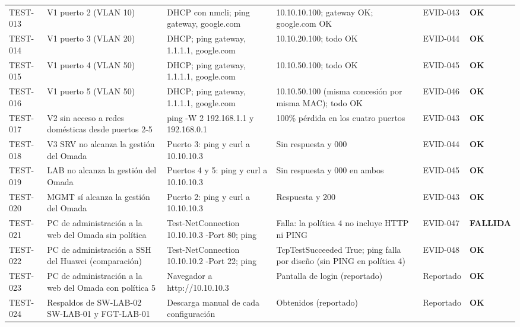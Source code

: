 \documentclass[11pt,a4paper]{article}
\newcommand{\estado}[1]{%
  \ifstrequal{#1}{COMPLETADA}{\textcolor{okgreen}{\textbf{\footnotesize #1}}}{%
  \ifstrequal{#1}{OPERATIVO VALIDADO}{\textcolor{okgreen}{\textbf{\footnotesize #1}}}{%
  \ifstrequal{#1}{OK}{\textcolor{okgreen}{\textbf{\footnotesize #1}}}{%
  \ifstrequal{#1}{RESUELTO}{\textcolor{okgreen}{\textbf{\footnotesize #1}}}{%
  \ifstrequal{#1}{EN CURSO}{\textcolor{amber}{\textbf{\footnotesize #1}}}{%
  \ifstrequal{#1}{REPORTADO}{\textcolor{amber}{\textbf{\footnotesize #1}}}{%
  \ifstrequal{#1}{NO EJECUTADA}{\textcolor{muted}{\textbf{\footnotesize #1}}}{%
  \ifstrequal{#1}{PROPUESTO}{\textcolor{violet}{\textbf{\footnotesize #1}}}{%
  \ifstrequal{#1}{PENDIENTE}{\textcolor{alertred}{\textbf{\footnotesize #1}}}{%
  \textbf{\footnotesize #1}}}}}}}}}}}
\begin{document}
{\begin{longtable}{L{1.35cm} L{2.7cm} L{3.0cm} L{3.6cm} L{1.6cm} L{2.35cm}}
  TEST-013 & V1 puerto 2 (VLAN 10) & DHCP con nmcli; ping gateway, google.com & 10.10.10.100; gateway OK; google.com OK & EVID-043 & \estado{OK}\\
  TEST-014 & V1 puerto 3 (VLAN 20) & DHCP; ping gateway, 1.1.1.1, google.com & 10.10.20.100; todo OK & EVID-044 & \estado{OK}\\
  TEST-015 & V1 puerto 4 (VLAN 50) & DHCP; ping gateway, 1.1.1.1, google.com & 10.10.50.100; todo OK & EVID-045 & \estado{OK}\\
  TEST-016 & V1 puerto 5 (VLAN 50) & DHCP; ping gateway, 1.1.1.1, google.com & 10.10.50.100 (misma concesión por misma MAC); todo OK & EVID-046 & \estado{OK}\\
  TEST-017 & V2 sin acceso a redes domésticas desde puertos 2-5 & ping -W 2 192.168.1.1 y 192.168.0.1 & 100\% pérdida en los cuatro puertos & EVID-043 & \estado{OK}\\
  TEST-018 & V3 SRV no alcanza la gestión del Omada & Puerto 3: ping y curl a 10.10.10.3 & Sin respuesta y 000 & EVID-044 & \estado{OK}\\
  TEST-019 & LAB no alcanza la gestión del Omada & Puertos 4 y 5: ping y curl a 10.10.10.3 & Sin respuesta y 000 en ambos & EVID-045 & \estado{OK}\\
  TEST-020 & MGMT sí alcanza la gestión del Omada & Puerto 2: ping y curl a 10.10.10.3 & Respuesta y 200 & EVID-043 & \estado{OK}\\
  TEST-021 & PC de administración a la web del Omada sin política & Test-NetConnection 10.10.10.3 -Port 80; ping & Falla: la política 4 no incluye HTTP ni PING & EVID-047 & \estado{FALLIDA}\\
  TEST-022 & PC de administración a SSH del Huawei (comparación) & Test-NetConnection 10.10.10.2 -Port 22; ping & TcpTestSucceeded True; ping falla por diseño (sin PING en política 4) & EVID-048 & \estado{OK}\\
  TEST-023 & PC de administración a la web del Omada con política 5 & Navegador a http://10.10.10.3 & Pantalla de login (reportado) & Reportado & \estado{OK}\\
  TEST-024 & Respaldos de SW-LAB-02 SW-LAB-01 y FGT-LAB-01 & Descarga manual de cada configuración & Obtenidos (reportado) & Reportado & \estado{OK}\\
  \bottomrule
\end{longtable}
}
\end{document}
